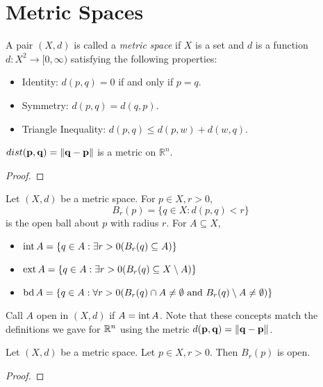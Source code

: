 \documentclass[letterpaper, twoside, 12pt]{book}
\begin{document}
\chapter{Metric Spaces}

\begin{definition}
  A pair \((X,d)\) is called a \textit{metric space} if \(X\) is a set
  and \(d\) is a function \(d:X^2\to[0,\infty)\) satisfying the following
  properties:
  \begin{itemize}
    \item Identity: \(d(p,q)=0\) if and only if \(p=q\).
    \item Symmetry: \(d(p,q)=d(q,p)\).
    \item Triangle Inequality: \(d(p,q)\leq d(p,w)+d(w,q)\).
  \end{itemize}
\end{definition}

\begin{theorem}[12.2]
  \(dist(\mathbf p,\mathbf q)=\|\mathbf q-\mathbf p\|\) is
  a metric on \(\mathbb R^n\).
\end{theorem}
\begin{proof}

\end{proof}

\begin{definition}
  Let \((X,d)\) be a metric space. For \(p\in X,r>0\),
    \[ B_r(p)=\{q\in X:d(p,q)<r\} \]
  is the open ball about \(p\) with radius \(r\). For \(A\subseteq X\),
  \begin{itemize}
    \item \(\operatorname{int} A = \{q\in A:\exists r>0(B_r(q)\subseteq A)\}\)
    \item \(\operatorname{ext} A = \{q\in A:\exists r>0(B_r(q)\subseteq X\setminus A)\}\)
    \item \(\operatorname{bd} A = \{q\in A:\forall r>0(B_r(q)\cap A\not=\emptyset\text{ and }B_r(q)\setminus A\not=\emptyset)\}\)
  \end{itemize}
  Call \(A\) open in \((X,d)\) if \(A=\operatorname{int} A\).
  Note that these concepts match the definitions we gave for \(\mathbb R^n\)
  using the metric \(d(\mathbf p,\mathbf q)=\|\mathbf q-\mathbf p\|\).
\end{definition}

\begin{theorem}[12.8]
  Let \((X,d)\) be a metric space. Let \(p\in X,r>0\). Then
  \(B_r(p)\) is open.
\end{theorem}
\begin{proof}

\end{proof}
\end{document}
